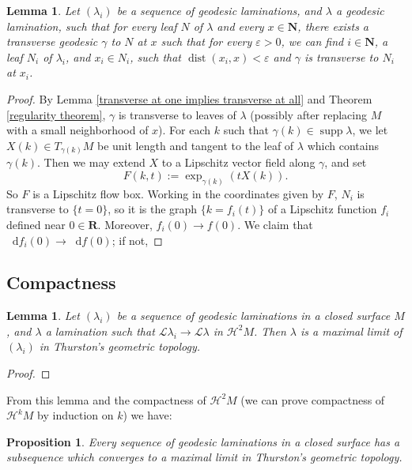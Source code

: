 \documentclass[reqno,10pt]{amsart}
\newcommand{\NN}{\mathbf{N}}
\newcommand{\RR}{\mathbf{R}}
\newcommand*\dif{\mathop{}\!\mathrm{d}}
\DeclareMathOperator{\dist}{dist}
\DeclareMathOperator{\supp}{supp}
\newcommand{\Leaves}{\mathscr L}
\newcommand{\Hypspace}{\mathscr H}
\newtheorem{lemma}[theorem]{Lemma}
\newtheorem{proposition}[theorem]{Proposition}
\theoremstyle{definition}
\numberwithin{equation}{section}
\begin{document}
\begin{lemma}
Let $(\lambda_i)$ be a sequence of geodesic laminations, and $\lambda$ a geodesic lamination, such that for every leaf $N$ of $\lambda$ and every $x \in \NN$, there exists a transverse geodesic $\gamma$ to $N$ at $x$ such that for every $\varepsilon > 0$, we can find $i \in \NN$, a leaf $N_i$ of $\lambda_i$, and $x_i \in N_i$, such that $\dist(x_i, x) < \varepsilon$ and $\gamma$ is transverse to $N_i$ at $x_i$.
\end{lemma}
\begin{proof}
By Lemma \ref{transverse at one implies transverse at all} and Theorem \ref{regularity theorem}, $\gamma$ is transverse to leaves of $\lambda$ (possibly after replacing $M$ with a small neighborhood of $x$).
For each $k$ such that $\gamma(k) \in \supp \lambda$, we let $X(k) \in T_{\gamma(k)} M$ be unit length and tangent to the leaf of $\lambda$ which contains $\gamma(k)$.
Then we may extend $X$ to a Lipschitz vector field along $\gamma$, and set
$$F(k, t) := \exp_{\gamma(k)}(tX(k)).$$
So $F$ is a Lipschitz flow box.
Working in the coordinates given by $F$, $N_i$ is transverse to $\{t = 0\}$, so it is the graph $\{k = f_i(t)\}$ of a Lipschitz function $f_i$ defined near $0 \in \RR$.
Moreover, $f_i(0) \to f(0)$.
We claim that $\dif f_i(0) \to \dif f(0)$; if not,
\end{proof}

\subsection{Compactness}

\begin{lemma}
Let $(\lambda_i)$ be a sequence of geodesic laminations in a closed surface $M$, and $\lambda$ a lamination such that $\Leaves \lambda_i \to \Leaves \lambda$ in $\Hypspace^2 M$.
Then $\lambda$ is a maximal limit of $(\lambda_i)$ in Thurston's geometric topology.
\end{lemma}
\begin{proof}

\end{proof}

From this lemma and the compactness of $\Hypspace^2 M$ (we can prove compactness of $\Hypspace^k M$ by induction on $k$) we have:

\begin{proposition}
Every sequence of geodesic laminations in a closed surface has a subsequence which converges to a maximal limit in Thurston's geometric topology.
\end{proposition}
\end{document}
